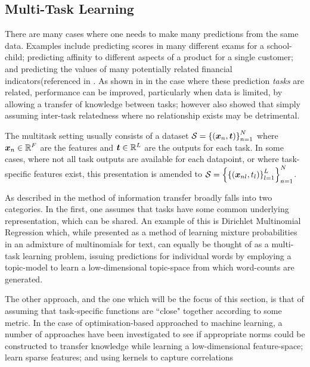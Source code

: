 

\subsection{Multi-Task Learning}

There are many cases where one needs to make many predictions from the same data. Examples include predicting scores in many different exams for a school-child\cite{Bonilla2008}\cite{Evgeniou2005}; predicting affinity to different aspects of a product for a single customer\cite{Allenby1999}; and predicting the values of many potentially related financial indicators(referenced in \cite{Evgeniou2005}. As shown in \cite{Caruana1997} in the case where these prediction \emph{tasks} are related, performance can be improved, particularly when data is limited, by allowing a transfer of knowledge between tasks; however \cite{Caruana1997} also showed that simply assuming inter-task relatedness where no relationship exists may be detrimental.

The multitask setting usually consists of a dataset $\mathcal{S} = \left\{\left(\bm x_n, \bm t\right)\right\}_{n=1}^N$ where $\bm x_n \in { \mathbb{R}^{F} }$ are the features and $\bm t \in { \mathbb{R}^{L} }$ are the outputs for each task. In some cases, where not all task outputs are available for each datapoint, or where task-specific features exist, this presentation is amended to $\mathcal{S} = \left\{\left\{\left(\bm x_{nl}, t_l\right)\right\}_{l=1}^L\right\}_{n=1}^N$. 

As described in\cite{Argyriou2005} the method of information transfer broadly falls into two categories. In the first, one assumes that tasks have some common underlying representation, which can be shared\cite{Caruana1997}. An example of this is Dirichlet Multinomial Regression\cite{Mimno2008} which, while presented as a method of learning mixture probabilities in an admixture of multinomials for text, can equally be thought of as a multi-task learning problem, issuing predictions for individual words by employing a topic-model to learn a low-dimensional topic-space from which word-counts are generated. 

The other approach, and the one which will be the focus of this section, is that of assuming that task-specific functions are ``close" together according to some metric. In the case of optimisation-based approached to machine learning, a number of approaches have been investigated to see if appropriate norms could be constructed to transfer knowledge while learning a low-dimensional feature-space\cite{argyriou2007spectral}; learn sparse features\cite{Argyriou2005}; and using kernels to capture correlations\cite{Evgeniou2005}

